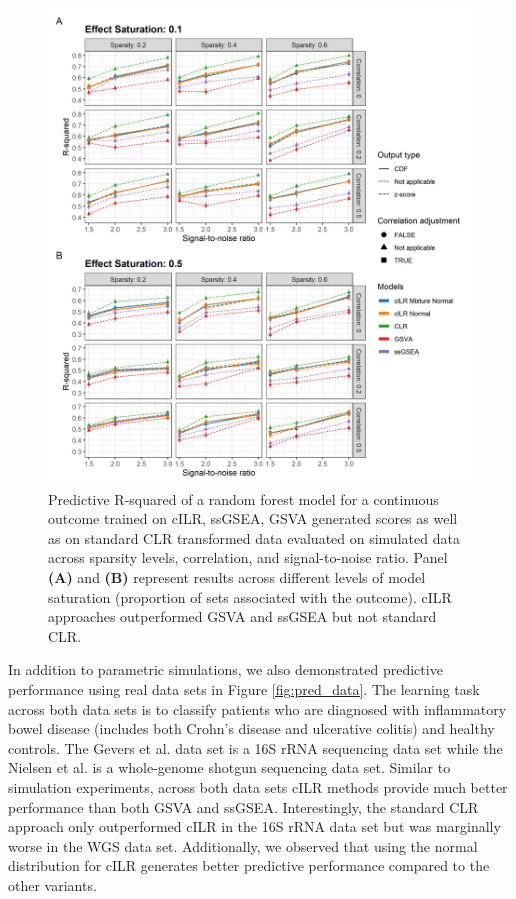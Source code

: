 \documentclass{article}
\begin{document}
\begin{figure}[H]
    \centering
    \includegraphics[width=\textwidth]{figures/sim_pred_rsq.png}
    \caption{Predictive R-squared of a random forest model for a continuous outcome trained on cILR, ssGSEA, GSVA generated scores as well as on standard CLR transformed data evaluated on simulated data across sparsity levels, correlation, and signal-to-noise ratio. Panel \textbf{(A)} and \textbf{(B)} represent results across different levels of model saturation (proportion of sets associated with the outcome). cILR approaches outperformed GSVA and ssGSEA but not standard CLR.}
    \label{fig:sim_pred_rsq}
\end{figure}

In addition to parametric simulations, we also demonstrated predictive performance using real data sets in Figure \ref{fig:pred_data}. The learning task across both data sets is to classify patients who are diagnosed with inflammatory bowel disease (includes both Crohn's disease and ulcerative colitis) and healthy controls. The Gevers et al. \cite{gevers2014} data set is a 16S rRNA sequencing data set while the Nielsen et al. \cite{nielsen2014} is a whole-genome shotgun sequencing data set. Similar to simulation experiments, across both data sets cILR methods provide much better performance than both GSVA and ssGSEA. Interestingly, the standard CLR approach only outperformed cILR in the 16S rRNA data set but was marginally worse in the WGS data set. Additionally, we observed that using the normal distribution for cILR generates better predictive performance compared to the other variants.
\end{document}
